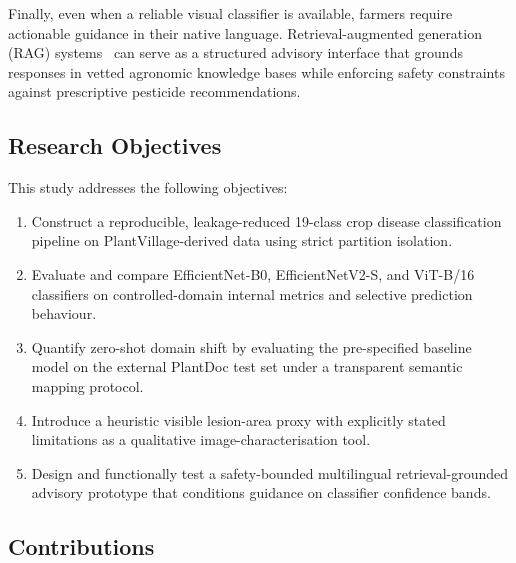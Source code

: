 \documentclass[conference]{IEEEtran}
\begin{document}
Finally, even when a reliable visual classifier is available, farmers
require actionable guidance in their native
language. Retrieval-augmented generation
(RAG) systems~\cite{lewis2020retrieval} can serve as a structured
advisory interface that grounds responses in vetted agronomic knowledge
bases while enforcing safety constraints against prescriptive pesticide
recommendations.

\subsection{Research Objectives}

This study addresses the following objectives:
\begin{enumerate}
    \item Construct a reproducible, leakage-reduced 19-class crop
          disease classification pipeline on PlantVillage-derived data
          using strict partition isolation.
    \item Evaluate and compare EfficientNet-B0, EfficientNetV2-S, and
          ViT-B/16 classifiers on controlled-domain internal metrics
          and selective prediction behaviour.
    \item Quantify zero-shot domain shift by evaluating the
          pre-specified baseline model on the external PlantDoc test
          set under a transparent semantic mapping protocol.
    \item Introduce a heuristic visible lesion-area proxy with
          explicitly stated limitations as a qualitative
          image-characterisation tool.
    \item Design and functionally test a safety-bounded multilingual
          retrieval-grounded advisory prototype that conditions guidance
          on classifier confidence bands.
\end{enumerate}

\subsection{Contributions}
\end{document}
